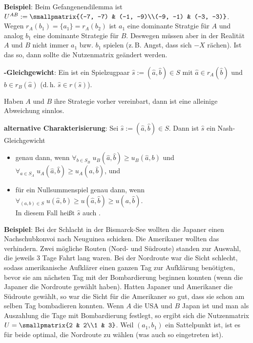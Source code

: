 \textbf{Beispiel}:
Beim Gefangenendilemma ist $U^{AB} := \smallpmatrix{(-7, -7) & (-1, -9)\\(-9, -1) & (-3, -3)}$.\\
Wegen $r_A(b_1) = \{a_1\} = r_A(b_2)$ ist $a_1$ eine dominante Stratgie für $A$
und analog $b_1$ eine dominante Strategie für $B$.
Deswegen müssen aber in der Realität $A$ und $B$ nicht immer $a_1$ bzw. $b_1$ spielen
(z.\,B. Angst, dass sich $-X$ rächen).
Ist das so, dann sollte die Nutzenmatrix geändert werden.

\linie
\pagebreak

\textbf{-Gleichgewicht}:
Ein  ist ein Spielzugpaar
$\widehat{s} := (\widehat{a}, \widehat{b}) \in S$ mit
$\widehat{a} \in r_A(\widehat{b})$ und $\widehat{b} \in r_B(\widehat{a})$
(d.\,h. $\widehat{s} \in r(\widehat{s})$).

Haben $A$ und $B$ ihre Strategie vorher vereinbart, dann ist eine alleinige Abweichung sinnlos.

\textbf{alternative Charakterisierung}:
Sei $\widehat{s} := (\widehat{a}, \widehat{b}) \in S$.
Dann ist $\widehat{s}$ ein Nash-Gleichgewicht
\begin{itemize}
    \item
    genau dann, wenn
    $\forall_{b \in S_B}\; u_B(\widehat{a}, \widehat{b}) \ge u_B(\widehat{a}, b)$ und
    $\forall_{a \in S_A}\; u_A(\widehat{a}, \widehat{b}) \ge u_A(a, \widehat{b})$, und
    
    \item
    für ein Nullsummenspiel genau dann, wenn
    $\forall_{(a, b) \in S}\;
    u(\widehat{a}, b) \ge u(\widehat{a}, \widehat{b}) \ge u(a, \widehat{b})$.\\
    In diesem Fall heißt $\widehat{s}$ auch .
\end{itemize}

\linie

\textbf{Beispiel}:
Bei der Schlacht in der Bismarck-See wollten die Japaner einen Nachschubkonvoi nach Neuguinea
schicken.
Die Amerikaner wollten das verhindern.
Zwei mögliche Routen (Nord- und Südroute) standen zur Auswahl,
die jeweils $3$ Tage Fahrt lang waren.
Bei der Nordroute war die Sicht schlecht, sodass amerikanische Aufklärer einen ganzen Tag zur
Aufklärung benötigten, bevor sie am nächsten Tag mit der Bombardierung beginnen konnten
(wenn die Japaner die Nordroute gewählt haben).
Hatten Japaner und Amerikaner die Südroute gewählt, so war die Sicht für die Amerikaner so gut,
dass sie schon am selben Tag bombadieren konnten.
Wenn $A$ die USA und $B$ Japan ist und man als Auszahlung die Tage mit Bombardierung festlegt,
so ergibt sich die Nutzenmatrix $U = \smallpmatrix{2 & 2\\1 & 3}$.
Weil $(a_1, b_1)$ ein Sattelpunkt ist, ist es für beide optimal, die Nordroute zu wählen
(was auch so eingetreten ist).

